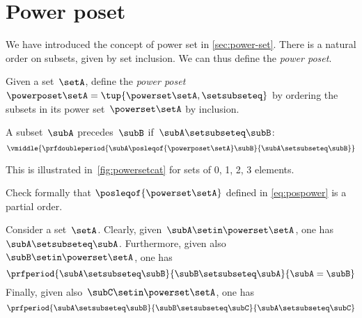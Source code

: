 \section{Power poset}

We have introduced the concept of power set in \cref{sec:power-set}.
There is a natural order on subsets, given by set inclusion.
We can thus define the \emph{power poset}.

\begin{definition}
    \label{def:power-poset}
    Given a set~$\setA$,
    define the \emph{power poset}~$\powerposet\setA = \tup{\powerset\setA,\setsubseteq}$ by ordering the subsets in its power set~$\powerset\setA$ by inclusion.

    A subset~$\subA$ precedes~$\subB$ if~$\subA \setsubseteq \subB$:
    \begin{equation}
        \label{eq:pospower}
        \vmiddle{
            \prfdoubleperiod{
                \subA \posleqof{\powerposet\setA} \subB
            }{
                \subA \setsubseteq \subB
            }
        }
    \end{equation}
\end{definition}
This is illustrated in~\cref{fig:powersetcat} for sets of 0, 1, 2, 3 elements.
\begin{exercise}
    Check formally that $\posleqof{\powerset\setA}$ defined in \cref{eq:pospower} is a partial order.
\end{exercise}
\begin{solution}
    Consider a set~$\setA$.
    Clearly, given~$\subA\setin \powerset \setA$, one has~$\subA\setsubseteq \subA$.
    Furthermore, given also~$\subB\setin \powerset \setA$, one has
    \begin{equation}
        \prfperiod{\subA\setsubseteq \subB}{\subB\setsubseteq \subA}{\subA=\subB}
    \end{equation}
    Finally, given also~$\subC\setin \powerset \setA$, one has
    \begin{equation}
        \prfperiod{\subA\setsubseteq \subB}{\subB\setsubseteq \subC}{\subA\setsubseteq\subC}
    \end{equation}
\end{solution}
\vfill
\begin{figure*}[h]
    \centering
    \hfill
    \hfill
    \hfill
    \caption{Power set as a poset.
    }
    \label{fig:powersetcat}
\end{figure*}
\vfill
